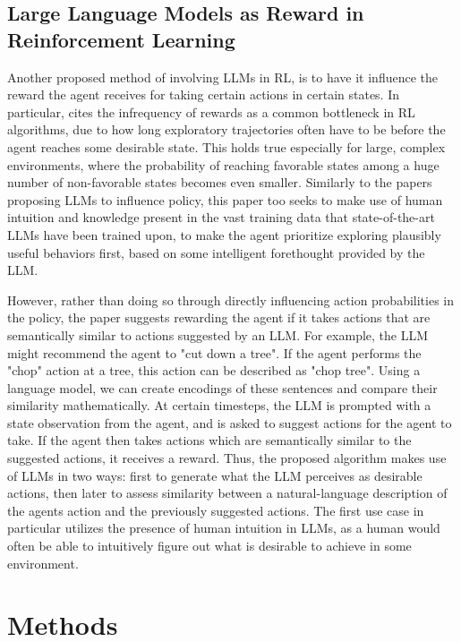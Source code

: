 \documentclass[conference]{IEEEtran}
\begin{document}
\subsection{Large Language Models as Reward in Reinforcement Learning}

Another proposed method of involving LLMs in RL, is to have it influence the reward the agent receives for taking certain actions in certain states. In particular, \cite{ellm} cites the infrequency of rewards as a common bottleneck in RL algorithms, due to how long exploratory trajectories often have to be before the agent reaches some desirable state. This holds true especially for large, complex environments, where the probability of reaching favorable states among a huge number of non-favorable states becomes even smaller. Similarly to the papers proposing LLMs to influence policy, this paper too seeks to make use of human intuition and knowledge present in the vast training data that state-of-the-art LLMs have been trained upon, to make the agent prioritize exploring plausibly useful behaviors first, based on some intelligent forethought provided by the LLM.

However, rather than doing so through directly influencing action probabilities in the policy, the paper suggests rewarding the agent if it takes actions that are semantically similar to actions suggested by an LLM. For example, the LLM might recommend the agent to "cut down a tree". If the agent performs the "chop" action at a tree, this action can be described as "chop tree". Using a language model, we can create encodings of these sentences and compare their similarity mathematically. At certain timesteps, the LLM is prompted with a state observation from the agent, and is asked to suggest actions for the agent to take. If the agent then takes actions which are semantically similar to the suggested actions, it receives a reward. Thus, the proposed algorithm makes use of LLMs in two ways: first to generate what the LLM perceives as desirable actions, then later to assess similarity between a natural-language description of the agents action and the previously suggested actions. The first use case in particular utilizes the presence of human intuition in LLMs, as a human would often be able to intuitively figure out what is desirable to achieve in some environment.

\section{Methods}
\end{document}
